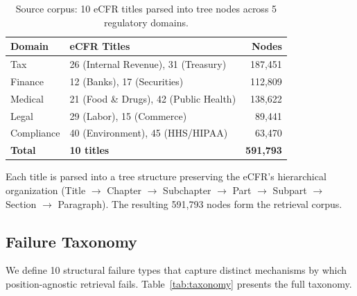 \documentclass[11pt]{article}
\begin{document}
\begin{table}[h]
\centering
\small
\begin{tabular}{llr}
\toprule
\textbf{Domain} & \textbf{eCFR Titles} & \textbf{Nodes} \\
\midrule
Tax & 26 (Internal Revenue), 31 (Treasury) & 187,451 \\
Finance & 12 (Banks), 17 (Securities) & 112,809 \\
Medical & 21 (Food \& Drugs), 42 (Public Health) & 138,622 \\
Legal & 29 (Labor), 15 (Commerce) & 89,441 \\
Compliance & 40 (Environment), 45 (HHS/HIPAA) & 63,470 \\
\midrule
\textbf{Total} & \textbf{10 titles} & \textbf{591,793} \\
\bottomrule
\end{tabular}
\caption{Source corpus: 10 eCFR titles parsed into tree nodes across 5 regulatory domains.}
\label{tab:corpus}
\end{table}

Each title is parsed into a tree structure preserving the eCFR's hierarchical organization (Title $\to$ Chapter $\to$ Subchapter $\to$ Part $\to$ Subpart $\to$ Section $\to$ Paragraph). The resulting 591,793 nodes form the retrieval corpus.

\subsection{Failure Taxonomy}
\label{sec:taxonomy}

We define 10 structural failure types that capture distinct mechanisms by which position-agnostic retrieval fails. Table~\ref{tab:taxonomy} presents the full taxonomy.
\end{document}
